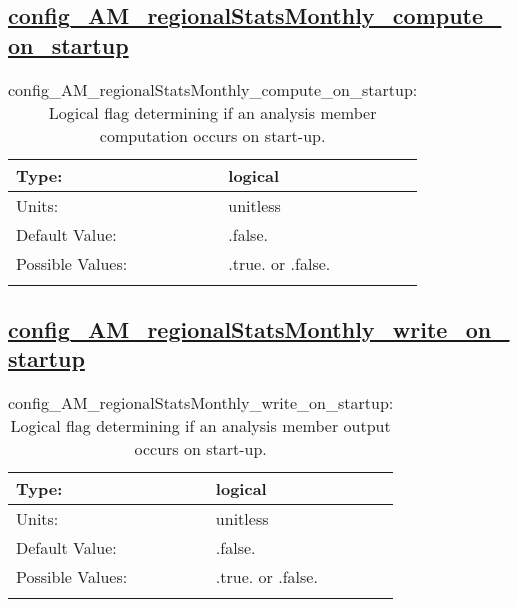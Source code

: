 \subsection[config\_AM\_regionalStatsMonthly\_compute\_on\_startup]{\hyperref[sec:nm_tab_AM_regionalStatsMonthly]{config\_AM\_regionalStatsMonthly\_compute\_on\_startup}}
\label{subsec:nm_sec_config_AM_regionalStatsMonthly_compute_on_startup}
\begin{center}
\begin{longtable}{| p{2.0in} || p{4.0in} |}
    \hline
    Type: & logical \\
    \hline
    Units: & \si{unitless} \\
    \hline
    Default Value: & .false. \\
    \hline
    Possible Values: & .true. or .false. \\
    \hline
    \caption{config\_AM\_regionalStatsMonthly\_compute\_on\_startup: Logical flag determining if an analysis member computation occurs on start-up.}
\end{longtable}
\end{center}
\subsection[config\_AM\_regionalStatsMonthly\_write\_on\_startup]{\hyperref[sec:nm_tab_AM_regionalStatsMonthly]{config\_AM\_regionalStatsMonthly\_write\_on\_startup}}
\label{subsec:nm_sec_config_AM_regionalStatsMonthly_write_on_startup}
\begin{center}
\begin{longtable}{| p{2.0in} || p{4.0in} |}
    \hline
    Type: & logical \\
    \hline
    Units: & \si{unitless} \\
    \hline
    Default Value: & .false. \\
    \hline
    Possible Values: & .true. or .false. \\
    \hline
    \caption{config\_AM\_regionalStatsMonthly\_write\_on\_startup: Logical flag determining if an analysis member output occurs on start-up.}
\end{longtable}
\end{center}
